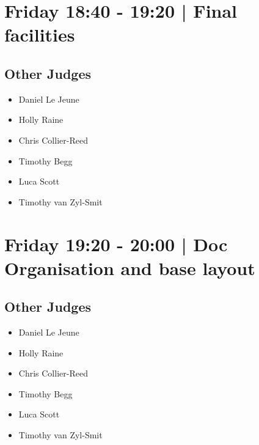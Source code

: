 \documentclass[10pt]{article}
\begin{document}
            \section*{Friday 18:40
        -
        19:20
        |
         Final facilities}
        
                
        \subsection*{Other Judges}
        
            \begin{itemize}
                            \item Daniel Le Jeune
                            \item Holly Raine
                            \item Chris Collier-Reed
                            \item Timothy Begg
                            \item Luca Scott
                            \item Timothy van Zyl-Smit
                        \end{itemize}
        

            \section*{Friday 19:20
        -
        20:00
        |
         Doc Organisation and base layout}
        
                
        \subsection*{Other Judges}
        
            \begin{itemize}
                            \item Daniel Le Jeune
                            \item Holly Raine
                            \item Chris Collier-Reed
                            \item Timothy Begg
                            \item Luca Scott
                            \item Timothy van Zyl-Smit
                        \end{itemize}
        
\end{document}
